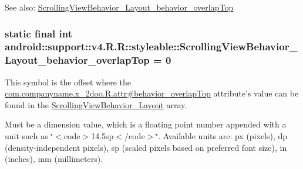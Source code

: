 \begin{Desc}
\item[See also:]\hyperlink{classandroid_1_1support_1_1v4_1_1_r_1_1styleable_9fea49ba22c6071b652bd5d634a21a47}{ScrollingViewBehavior\_\-Layout\_\-behavior\_\-overlapTop} \end{Desc}
\hypertarget{classandroid_1_1support_1_1v4_1_1_r_1_1styleable_9fea49ba22c6071b652bd5d634a21a47}{
\subsubsection[{ScrollingViewBehavior\_\-Layout\_\-behavior\_\-overlapTop}]{\setlength{\rightskip}{0pt plus 5cm}static final int android::support::v4.R.R::styleable::ScrollingViewBehavior\_\-Layout\_\-behavior\_\-overlapTop = 0}}
\label{classandroid_1_1support_1_1v4_1_1_r_1_1styleable_9fea49ba22c6071b652bd5d634a21a47}


This symbol is the offset where the \hyperlink{classcom_1_1companyname_1_1x__2doo_1_1_r_1_1attr_92006eaab09d34ac9cd493afc42a15cc}{com.companyname.x\_\-2doo.R.attr\#behavior\_\-overlapTop} attribute's value can be found in the \hyperlink{classandroid_1_1support_1_1v4_1_1_r_1_1styleable_7f394b84e58daeccda900f698e6700ca}{ScrollingViewBehavior\_\-Layout} array.

Must be a dimension value, which is a floating point number appended with a unit such as \char`\"{}$<$code$>$14.5sp$<$/code$>$\char`\"{}. Available units are: px (pixels), dp (density-independent pixels), sp (scaled pixels based on preferred font size), in (inches), mm (millimeters). 

